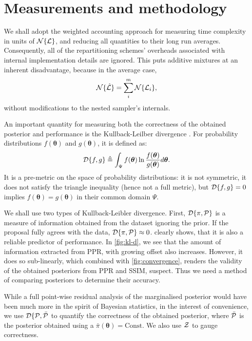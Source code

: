 \documentclass[usenatbib]{mnras}
\begin{document}
\section{Measurements and methodology}
We shall adopt the weighted accounting approach \citep{Cormen} for
measuring time complexity in units of \({\cal N}\{{\cal L}\}\), and
reducing all quantities to their long run averages. Consequently, all
of the repartitioning schemes' overheads associated with internal
implementation details are ignored. This puts additive mixtures at an
inherent disadvantage, because in the average case,
\begin{equation}
  \label{eq:additive-t-complexity}
  {\cal N}\{ \hat{\cal L}\} = \sum_{i}^{m} {\cal N}\{{\cal L}_{i}\}, 
\end{equation}
without modifications to the nested sampler's internals.

An important quantity for measuring both the correctness of the
obtained posterior and performance is the Kullback-Leilber divergence
\citep{Kullback_1951}. For probability distributions
\(f(\bm{\theta})\) and \(g(\bm{\theta})\), it is defined as:
\begin{equation}
  \label{eq:kl-def}
  {\cal D}\{f, g \} \triangleq \int_{\Psi}f(\bm{\theta}) \ln \frac{f(\bm{\theta})}{g(\bm{\theta})} d \bm{\theta}.
\end{equation}
It is a pre-metric on the space of probability distributions: it is
not symmetric, it does not satisfy the triangle inequality (hence not
a full metric), but ${\cal D}\{f, g \} =0 $ implies
\(f(\bm{\theta}) = g(\bm{\theta})\) in their common domain $\Psi$.

We shall use two types of Kullback-Leibler divergence. First,
${\cal D}\{\pi, {\cal P}\}$ is a measure of information obtained from
the dataset ignoring the prior. If the proposal fully agrees with the
data, ${\cal D}\{ \pi, {\cal P} \} \approx 0$.  
clearly shows, that it is also a reliable predictor of performance. In
\cref{fig:kl-d}, we see that the amount of information extracted from
PPR, with growing offset also increases. However, it does so
sub-linearly, which combined with \cref{fig:convergence}, renders the
validity of the obtained posteriors from PPR and SSIM, suspect. Thus
we need a method of comparing posteriors to determine their accuracy.

While a full point-wise residual analysis of the marginalised
posterior would have been much more in the spirit of Bayesian
statistics, in the interest of convenience, we use
${\cal D}\{ {\cal P}, \bar{\cal P}$ to quantify the correctness of the
obtained posterior, where $\bar{\cal P}$ is the posterior obtained
using a $\bar{\pi}(\bm{\theta}) = \text{Const}$. We also use
${\cal Z}$ to gauge correctness.
\end{document}
